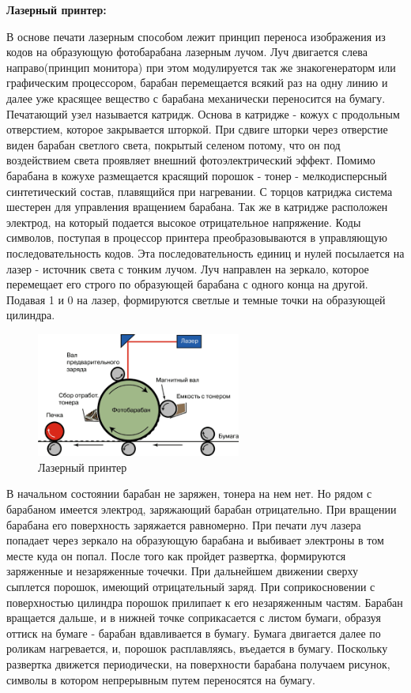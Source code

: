 \documentclass[unicode, 12pt, a4paper, oneside]{article}
\begin{document}
{\bf Лазерный принтер:}

В основе печати лазерным способом лежит принцип переноса изображения из кодов на образующую фотобарабана лазерным лучом. Луч двигается слева направо(принцип монитора) при этом модулируется так же знакогенераторм или графическим процессором, барабан перемещается всякий раз на одну линию и далее уже красящее вещество с барабана механически переносится на бумагу. Печатающий узел называется катридж. Основа в катридже - кожух с продольным отверстием, которое закрывается шторкой. При сдвиге шторки через отверстие виден барабан светлого света, покрытый селеном потому, что он под воздействием света проявляет внешний фотоэлектрический эффект. Помимо барабана в кожухе размещается красящий порошок - тонер - мелкодисперсный синтетический состав, плавящийся при нагревании. С торцов катриджа система шестерен для управления вращением барабана. Так же в катридже расположен электрод, на который подается высокое отрицательное напряжение. Коды символов, поступая в процессор принтера преобразовываются в управляющую последовательность кодов. Эта последовательность единиц и нулей посылается на лазер - источник света с тонким лучом. Луч направлен на зеркало, которое перемещает его строго по образующей барабана с одного конца на другой. Подавая 1 и 0 на лазер, формируются светлые и темные точки на образующей цилиндра.
\begin{figure}[H]
\centering
\includegraphics[width=0.6\textwidth]{105_Laser.png}
\caption{Лазерный принтер}
\end{figure}
В начальном состоянии барабан не заряжен, тонера на нем нет. Но рядом с барабаном имеется электрод, заряжающий барабан отрицательно. При вращении барабана его поверхность заряжается равномерно. При печати луч лазера попадает через зеркало на образующую барабана и выбивает электроны в том месте куда он попал. После того как пройдет развертка, формируются заряженные и незаряженные точечки. При дальнейшем движении сверху сыплется порошок, имеющий отрицательный заряд. При соприкосновении с поверхностью цилиндра порошок прилипает к его незаряженным частям. Барабан вращается дальше, и в нижней точке соприкасается с листом бумаги, образуя оттиск на бумаге - барабан вдавливается в бумагу. Бумага двигается далее по роликам нагревается, и, порошок расплавляясь, въедается в бумагу. Поскольку развертка движется периодически, на поверхности барабана получаем рисунок, символы в котором непрерывным путем переносятся на бумагу.
\end{document}
